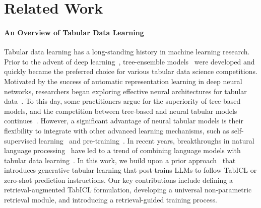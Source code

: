 \section{Related Work}
\label{sec:rel_work}

\paragraph{An Overview of Tabular Data Learning}
Tabular data learning has a long-standing history in machine learning research. Prior to the advent of deep learning~\citep{lecun2015DL}, tree-ensemble models~\citep{chen2016XGBoost,ke2017LightGBM,prokhorenkova2018catboost} were developed and quickly became the preferred choice for various tabular data science competitions. Motivated by the success of automatic representation learning in deep neural networks, researchers began exploring effective neural architectures for tabular data~\citep{huang2020TabTransformer,arik2021TabNet,katzir2021Net-DNF,gorishniy2021revisit_tab_dnn}. To this day, some practitioners argue for the superiority of tree-based models, and the competition between tree-based and neural tabular models continues~\citep{shwartzziv2022tab_dl_is_not_all,gorishniy2024TabR}. However, a significant advantage of neural tabular models is their flexibility to integrate with other advanced learning mechanisms, such as self-supervised learning~\citep{yoon2020VIME,somepalli2021SAINT,ucar2021SubTab,bahri2022SCARF} and pre-training~\citep{wang2022TransTab,levin2023transfer_tab_nn,zhu2023XTab,yang2023UniTabE,yan2024TP-BERTa,ye2024CM2}. In recent years, breakthroughs in natural language processing~\citep{kenton2019BERT,Brown2020GPT-3} have led to a trend of combining language models with tabular data learning~\citep{dinh2022LIFT,hegselmann2023TabLLM,yan2024TP-BERTa,ye2024CM2,wen2024GTL,gardner2024TabuLa}.
In this work, we build upon a prior approach~\citep{wen2024GTL} that introduces generative tabular learning that post-trains LLMs to follow TabICL or zero-shot prediction instructions.
Our key contributions include defining a retrieval-augmented TabICL formulation, developing a universal non-parametric retrieval module, and introducing a retrieval-guided training process.


